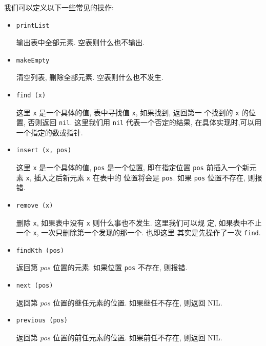 \documentclass[a4paper]{ctexart}
\theoremstyle{definition}
\theoremstyle{definition}
\begin{document}
我们可以定义以下一些常见的操作:
\begin{itemize}
\item
\begin{verbatim}
printList
\end{verbatim}
输出表中全部元素. 空表则什么也不输出.

\item
\begin{verbatim}
makeEmpty
\end{verbatim}
清空列表, 删除全部元素. 空表则什么也不发生. 

\item
\begin{verbatim}
find (x)
\end{verbatim}
这里 \verb|x| 是一个具体的值, 表中寻找值 \verb|x|, 如果找到, 返回第一
个找到的 \verb|x| 的位置, 否则返回 \verb|nil|. 这里我们用 \verb|nil|
代表一个否定的结果, 在具体实现时,可以用一个指定的数或指针.

\item 
\begin{verbatim}
insert (x, pos)
\end{verbatim}
这里 \verb|x| 是一个具体的值, \verb|pos| 是一个位置, 即在指定位置
\verb|pos| 前插入一个新元素 \verb|x|, 插入之后新元素 \verb|x| 在表中的
位置将会是 \verb|pos|. 如果 \verb|pos| 位置不存在, 则报错.

\item
\begin{verbatim}
remove (x)
\end{verbatim}
删除 \verb|x|, 如果表中没有 \verb|x| 则什么事也不发生. 这里我们可以规
定, 如果表中不止一个 \verb|x|, 一次只删除第一个发现的那一个. 也即这里
其实是先操作了一次 \verb|find|. 

\item
\begin{verbatim}
findKth (pos)
\end{verbatim}
返回第 $pos$ 位置的元素. 如果位置 \verb|pos| 不存在, 则报错.

\item
\begin{verbatim}
next (pos)
\end{verbatim}
返回第 $pos$ 位置的继任元素的位置. 如果继任不存在, 则返回 NIL.

\item
\begin{verbatim}
previous (pos)
\end{verbatim}
返回第 $pos$ 位置的前任元素的位置. 如果前任不存在, 则返回 NIL.
\end{itemize}
\end{document}
